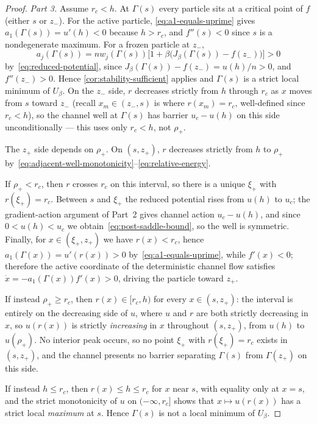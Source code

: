 \documentclass{article}
\theoremstyle{plain}
\theoremstyle{definition}
\theoremstyle{remark}
\begin{document}
\begin{proof}
\emph{Part 3.}
Assume \(r_c<h\). At \(\Gamma(s)\) every particle sits at a critical point of \(f\) (either \(s\) or \(z_-\)). For the active particle, \eqref{eq:a1-equals-uprime} gives \(a_1(\Gamma(s))=u'(h)<0\) because \(h>r_c\), and \(f''(s)<0\) since \(s\) is a nondegenerate maximum. For a frozen particle at \(z_-\),
\[
    a_j(\Gamma(s))=n w_j(\Gamma(s))\bigl[1+\beta\bigl(J_\beta(\Gamma(s))-f(z_-)\bigr)\bigr]>0
\]
by~\eqref{eq:reduced-potential}, since \(J_\beta(\Gamma(s))-f(z_-)=u(h)/n>0\), and \(f''(z_-)>0\).
Hence \ref{cor:stability-sufficient} applies and \(\Gamma(s)\) is a strict local minimum of \(U_\beta\). On the \(z_-\) side, \(r\) decreases strictly from \(h\) through \(r_c\) as \(x\) moves from \(s\) toward \(z_-\) (recall \(x_m\in(z_-,s)\) is where \(r(x_m)=r_c\), well-defined since \(r_c<h\)), so the channel well at \(\Gamma(s)\) has barrier \(u_c-u(h)\) on this side unconditionally --- this uses only \(r_c<h\), not \(\rho_+\).
 
The \(z_+\) side depends on \(\rho_+\). On \((s,z_+)\), \(r\) decreases strictly from \(h\) to \(\rho_+\) by~\eqref{eq:adjacent-well-monotonicity}--\eqref{eq:relative-energy}.
 
If \(\rho_+<r_c\), then \(r\) crosses \(r_c\) on this interval, so there is a unique \(\xi_+\) with \(r(\xi_+)=r_c\). Between \(s\) and \(\xi_+\) the reduced potential rises from \(u(h)\) to \(u_c\); the gradient-action argument of Part~2 gives channel action \(u_c-u(h)\), and since \(0<u(h)<u_c\) we obtain~\eqref{eq:post-saddle-bound}, so the well is symmetric. Finally, for \(x\in(\xi_+,z_+)\) we have \(r(x)<r_c\), hence \(a_1(\Gamma(x))=u'(r(x))>0\) by~\eqref{eq:a1-equals-uprime}, while \(f'(x)<0\); therefore the active coordinate of the deterministic channel flow satisfies \(\dot x=-a_1(\Gamma(x))f'(x)>0\), driving the particle toward \(z_+\).
 
If instead \(\rho_+\ge r_c\), then \(r(x)\in[r_c,h)\) for every \(x\in(s,z_+)\): the interval is entirely on the decreasing side of \(u\), where \(u\) and \(r\) are both strictly decreasing in \(x\), so \(u(r(x))\) is strictly \emph{increasing} in \(x\) throughout \((s,z_+)\), from \(u(h)\) to \(u(\rho_+)\). No interior peak occurs, so no point \(\xi_+\) with \(r(\xi_+)=r_c\) exists in \((s,z_+)\), and the channel presents no barrier separating \(\Gamma(s)\) from \(\Gamma(z_+)\) on this side.
 
If instead \(h\le r_c\), then \(r(x)\le h\le r_c\) for \(x\) near \(s\), with equality only at \(x=s\), and the strict monotonicity of \(u\) on \((-\infty,r_c]\) shows that \(x\mapsto u(r(x))\) has a strict local \emph{maximum} at \(s\). Hence \(\Gamma(s)\) is not a local minimum of \(U_\beta\).
\end{proof}
\end{document}
